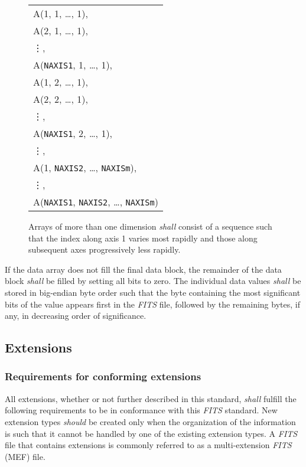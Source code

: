 \documentclass[onecolumn]{aa}
\begin{document}
\begin{figure}[t]
 \begin{center}
\begin{tabular}{l} \\
          A(1, 1, \ldots, 1), \\ 
          A(2, 1, \ldots, 1), \\ 
          \hspace{0.5in}\vdots, \\ 
          A({\tt NAXIS1}, 1, \ldots, 1), \\
          A(1, 2, \ldots, 1), \\ 
          A(2, 2, \ldots, 1), \\ 
          \hspace{0.5in}\vdots, \\ 
          A({\tt NAXIS1}, 2, \ldots, 1), \\
          \hspace{0.5in}\vdots,          \\ 
          A(1, {\tt NAXIS2}, \ldots, {\tt NAXISm}), \\  
          \hspace{0.5in}\vdots,  \\ 
          A({\tt NAXIS1}, {\tt NAXIS2}, \ldots, {\tt NAXISm}) \\
\end{tabular}
\end{center}
\caption[Array data sequence]
   {Arrays of more than one dimension {\em shall} consist of a sequence 
   such that the index along axis 1 varies most rapidly and 
   those along subsequent axes progressively less rapidly. }
\label{f:array}

\end{figure}

   If the data array does not fill the final data block, the
   remainder of the data block {\em shall} be filled by setting all bits to zero.  
   The individual data values {\em shall} be stored   in 
   big-endian byte order such
   that the byte containing the most significant bits of the value appears
   first in the  {\em FITS\/} file, followed by the remaining bytes, if any,
   in decreasing order of significance.
  
  \subsection{Extensions}
  
   \subsubsection{Requirements for conforming extensions}
    \label{s:genext}  
   All extensions, 
   whether or not further described in this standard, {\em shall}
   fulfill the following requirements to be in conformance with
   this {\em FITS\/} standard. 
   New extension types {\em should} be created only when the organization
   of the information is such that it cannot be handled by one of 
   the existing extension types.  A {\em FITS\/} file that contains
   extensions is commonly referred to as a multi-extension {\em FITS\/} (MEF)
   file.
   
\end{document}
